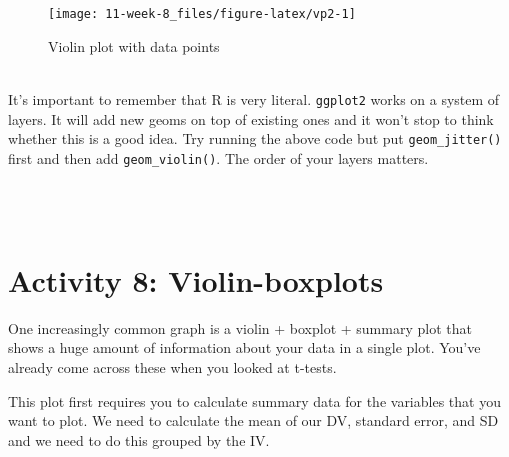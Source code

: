 \documentclass[]{book}
\newenvironment{Shaded}{\begin{snugshade}}{\end{snugshade}}
\newcommand{\CommentTok}[1]{\textcolor[rgb]{0.56,0.35,0.01}{\textit{#1}}}
\newcommand{\DataTypeTok}[1]{\textcolor[rgb]{0.13,0.29,0.53}{#1}}
\newcommand{\KeywordTok}[1]{\textcolor[rgb]{0.13,0.29,0.53}{\textbf{#1}}}
\newcommand{\NormalTok}[1]{#1}
\newcommand{\OperatorTok}[1]{\textcolor[rgb]{0.81,0.36,0.00}{\textbf{#1}}}
\newcommand{\OtherTok}[1]{\textcolor[rgb]{0.56,0.35,0.01}{#1}}
\newcommand{\StringTok}[1]{\textcolor[rgb]{0.31,0.60,0.02}{#1}}
\newenvironment{warning}
    {
    \hline\\
    }
    { 
    \\\\\hline
    }
\begin{document}
\begin{figure}

{\centering \texttt{[image: 11-week-8\_files/figure-latex/vp2-1]} 

}

\caption{Violin plot with data points}\label{fig:vp2}
\end{figure}

\begin{warning}
It's important to remember that R is very literal. \texttt{ggplot2}
works on a system of layers. It will add new geoms on top of existing
ones and it won't stop to think whether this is a good idea. Try running
the above code but put \texttt{geom\_jitter()} first and then add
\texttt{geom\_violin()}. The order of your layers matters.
\end{warning}

\hypertarget{viobox}{%
\section{Activity 8: Violin-boxplots}\label{viobox}}

One increasingly common graph is a violin + boxplot + summary plot that shows a huge amount of information about your data in a single plot. You've already come across these when you looked at t-tests.

This plot first requires you to calculate summary data for the variables that you want to plot. We need to calculate the mean of our DV, standard error, and SD and we need to do this grouped by the IV.

\begin{Shaded}
\end{Shaded}
\end{document}
